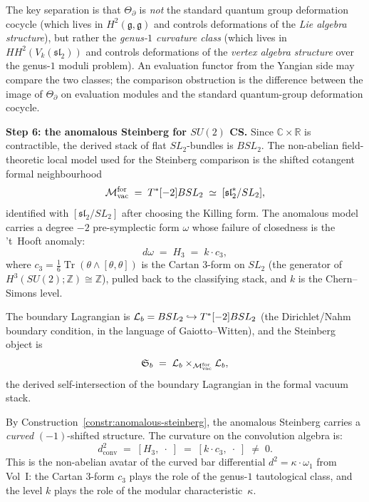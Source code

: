 \begin{construction}
The key separation is that $\Theta_\partial$ is \emph{not}
the standard quantum group deformation cocycle (which lives in
$H^2(\mathfrak{g},\mathfrak{g})$ and controls deformations of
the \emph{Lie algebra structure}), but rather the \emph{genus-$1$
curvature class} (which lives in
$HH^2(V_k(\mathfrak{sl}_2))$ and controls deformations of the
\emph{vertex algebra structure} over the genus-$1$ moduli problem).
An evaluation functor from the Yangian side may compare the two
classes; the comparison obstruction is the difference between the
image of \(\Theta_\partial\) on evaluation modules and the standard
quantum-group deformation cocycle.

\medskip
\noindent\textbf{Step 6: the anomalous Steinberg for $SU(2)$ CS.}
Since \(\mathbb C\times\mathbb R\) is contractible, the derived
stack of flat \(SL_2\)-bundles is \(BSL_2\).  The non-abelian
field-theoretic local model used for the Steinberg comparison is the
shifted cotangent formal neighbourhood
\[
\mathcal{M}_{\mathrm{vac}}^{\mathrm{for}}
\;=\;
T^*[-2]BSL_2
\;\simeq\;
[\mathfrak{sl}_2^*/SL_2],
\]
identified with \([\mathfrak{sl}_2/SL_2]\) after choosing the
Killing form.  The anomalous model carries a degree \(-2\)
pre-symplectic form \(\omega\) whose failure of closedness is the
't~Hooft anomaly:
\begin{equation}\label{eq:su2-anomaly-3form}
d\omega \;=\; H_3 \;=\; k\cdot c_3,
\end{equation}
where $c_3 = \tfrac{1}{6}\operatorname{Tr}(\theta\wedge[\theta,\theta])$
is the Cartan $3$-form on $SL_2$ (the generator of
$H^3(SU(2);\mathbb Z)\cong\mathbb Z$), pulled back to the
classifying stack, and $k$ is the Chern--Simons level.

The boundary Lagrangian is
\(\mathcal{L}_b = BSL_2 \hookrightarrow T^*[-2]BSL_2\)
(the Dirichlet/Nahm boundary condition, in the language of
Gaiotto--Witten), and the Steinberg object is
\[
\mathfrak{S}_b
\;=\;
\mathcal{L}_b\times_{\mathcal{M}_{\mathrm{vac}}^{\mathrm{for}}}\mathcal{L}_b,
\]
the derived self-intersection of the boundary Lagrangian in the
formal vacuum stack.

By Construction~\ref{constr:anomalous-steinberg}, the anomalous
Steinberg carries a \emph{curved} $(-1)$-shifted structure. The
curvature on the convolution algebra is:
\begin{equation}\label{eq:su2-curved-convolution}
d^2_{\mathrm{conv}}
\;=\;
[H_3,\;\cdot\;]
\;=\;
[k\cdot c_3,\;\cdot\;]
\;\neq\; 0.
\end{equation}
This is the non-abelian avatar of the curved bar differential
$d^2 = \kappa\cdot\omega_1$ from Vol~I: the Cartan $3$-form
$c_3$ plays the role of the genus-$1$ tautological class, and the
level $k$ plays the role of the modular characteristic~$\kappa$.


\end{construction}
